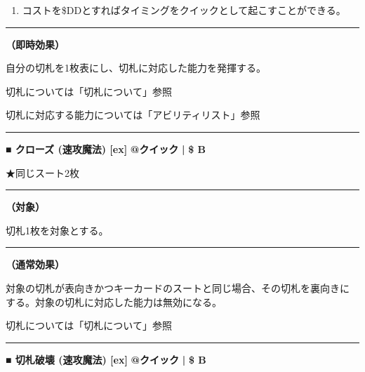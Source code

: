 \documentclass[twocolumn,a5paper,papersize,10pt]{jarticle}
\begin{document}
\vspace{-1zh}%
\begin{enumerate}
\renewcommand{\labelenumi}{※}
\setlength{\leftskip}{-0.3cm}
\setlength{\itemsep}{0pt} %
\setlength{\parskip}{0pt} %

\item コストを\$DDとすればタイミングをクイックとして起こすことができる。

\vspace{-3mm}%
\end{enumerate}
\vspace{1mm}%
\hrule height 0.1mm depth 0mm width 66.5mm %
\vspace{1mm}%

{\bf（即時効果）}

自分の切札を1枚表にし、切札に対応した能力を発揮する。 

切札については「切札について」参照

切札に対応する能力については「アビリティリスト」参照
\vspace{2mm} %
\hrule height 0.5mm depth 0mm width 66.5mm %
\vspace{1mm} %
{\normalsize\bf ■ クローズ {\scriptsize (速攻魔法) [ex]}} %
\hfill 
{\small\bf @クイック }
  {\small\bf | } {\small\bf \$ B}

★同じスート2枚

\vspace{1mm}%
\hrule height 0.1mm depth 0mm width 66.5mm %
\vspace{1mm}%
{\bf（対象）}

切札1枚を対象とする。
\vspace{1mm}%
\hrule height 0.1mm depth 0mm width 66.5mm %
\vspace{1mm}%

{\bf（通常効果）}

対象の切札が表向きかつキーカードのスートと同じ場合、その切札を裏向きにする。対象の切札に対応した能力は無効になる。 

切札については「切札について」参照
\vspace{2mm} %
\hrule height 0.5mm depth 0mm width 66.5mm %
\vspace{1mm} %
{\normalsize\bf ■ 切札破壊 {\scriptsize (速攻魔法) [ex]}} %
\hfill 
{\small\bf @クイック }
  {\small\bf | } {\small\bf \$ B}
\end{document}
